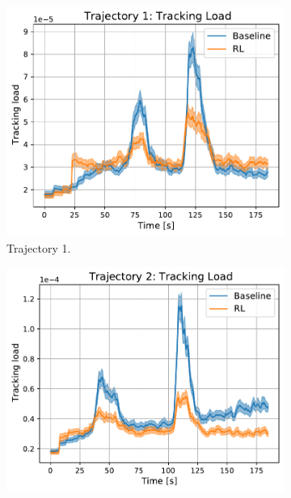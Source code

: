 \documentclass[english, 12pt, a4paper, elec, utf8, a-1b, online]{aaltothesis}
\numberwithin{equation}{section}
\begin{document}
\begin{figure}[h]
    \centering
    \begin{subfigure}[b]{0.45\textwidth}
        \centering
        \includegraphics[width=\linewidth]{figures/benchmark/Simulations/tracking_load_0.pdf}
        \caption{Trajectory 1.}
        \label{fig:TL_T1}
    \end{subfigure}
    \hfill
    \begin{subfigure}[b]{0.45\textwidth}
        \centering
        \includegraphics[width=\linewidth]{figures/benchmark/Simulations/tracking_load_1.pdf}

\end{subfigure}
\end{figure}
\end{document}

